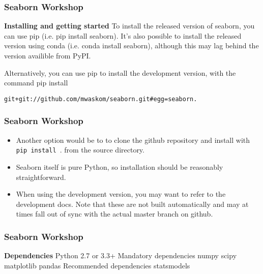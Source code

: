 \documentclass{beamer}
\begin{document}
\begin{frame}[fragile]
\frametitle{Seaborn Workshop}
\large
\textbf{Installing and getting started}
To install the released version of seaborn, you can use pip (i.e. pip install seaborn). It’s also possible to install the released version using conda (i.e. conda install seaborn), although this may lag behind the version availible from PyPI.

Alternatively, you can use pip to install the development version, with the command pip install
\begin{verbatim}
git+git://github.com/mwaskom/seaborn.git#egg=seaborn.
\end{verbatim}  
\end{frame}
\begin{frame}
	\frametitle{Seaborn Workshop}
	\large
\begin{itemize}
\item Another option would be to to clone the github repository and install with \texttt{pip install }. from the source directory. \item Seaborn itself is pure Python, so installation should be reasonably straightforward.

\item When using the development version, you may want to refer to the development docs. Note that these are not built automatically and may at times fall out of sync with the actual master branch on github.
\end{itemize}

\end{frame}
\begin{frame}
\frametitle{Seaborn Workshop}
\large
\noindent \textbf{Dependencies}
Python 2.7 or 3.3+
Mandatory dependencies
numpy
scipy
matplotlib
pandas
Recommended dependencies
statsmodels
\end{frame}
\end{document}

